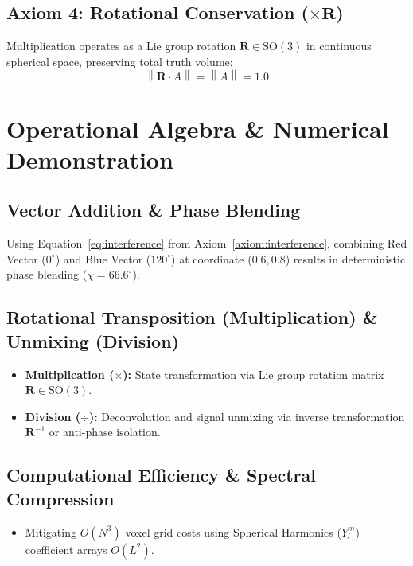 \documentclass[12pt, a4paper]{article}
\providecommand{\norm}[1]{\left\lVert#1\right\rVert}
\begin{document}
\subsection{Axiom 4: Rotational Conservation (\texorpdfstring{$\times \mathbf{R}$}{x R})}
\label{subsec:axiom4}
Multiplication operates as a Lie group rotation $\mathbf{R} \in \mathrm{SO}(3)$ in continuous spherical space, preserving total truth volume:
\begin{equation}
    \norm{\mathbf{R} \cdot A} = \norm{A} = 1.0
\end{equation}

\section{Operational Algebra \& Numerical Demonstration}

\subsection{Vector Addition \& Phase Blending}
Using Equation~\eqref{eq:interference} from Axiom~\ref{axiom:interference}, combining Red Vector ($0^\circ$) and Blue Vector ($120^\circ$) at coordinate ($0.6, 0.8$) results in deterministic phase blending ($\chi = 66.6^\circ$).

\subsection{Rotational Transposition (Multiplication) \& Unmixing (Division)}
\begin{itemize}
    \item \textbf{Multiplication ($\times$):} State transformation via Lie group rotation matrix $\mathbf{R} \in \mathrm{SO}(3)$.
    \item \textbf{Division ($\div$):} Deconvolution and signal unmixing via inverse transformation $\mathbf{R}^{-1}$ or anti-phase isolation.
\end{itemize}

\subsection{Computational Efficiency \& Spectral Compression}
\begin{itemize}
    \item Mitigating $O(N^3)$ voxel grid costs using Spherical Harmonics ($Y_l^m$) coefficient arrays $O(L^2)$.
\end{itemize}
\end{document}
